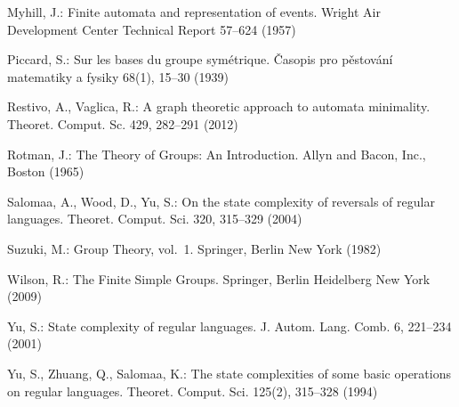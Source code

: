 \documentclass{llncs}
\begin{document}
\begin{thebibliography}{10}
Myhill, J.: Finite automata and representation of events. Wright Air
  Development Center Technical Report  57--624 (1957)

Piccard, S.: Sur les bases du groupe sym\'etrique. \v{C}asopis pro
  p\v{e}stov\'an\'i matematiky a fysiky  68(1),  15--30 (1939)

Restivo, A., Vaglica, R.: A graph theoretic approach to automata minimality.
  Theoret. Comput. Sc.  429,  282--291 (2012)

Rotman, J.: The Theory of Groups: An Introduction. Allyn and Bacon, Inc.,
  Boston (1965)

Salomaa, A., Wood, D., Yu, S.: On the state complexity of reversals of regular
  languages. Theoret. Comput. Sci.  320,  315--329 (2004)

Suzuki, M.: Group Theory, vol.~1. Springer, Berlin New York (1982)

Wilson, R.: The Finite Simple Groups. Springer, Berlin Heidelberg New York
  (2009)

Yu, S.: State complexity of regular languages. J. Autom. Lang. Comb.  6,
  221--234 (2001)

Yu, S., Zhuang, Q., Salomaa, K.: The state complexities of some basic
  operations on regular languages. Theoret. Comput. Sci.  125(2),  315--328
  (1994)

\end{thebibliography}
\end{document}
